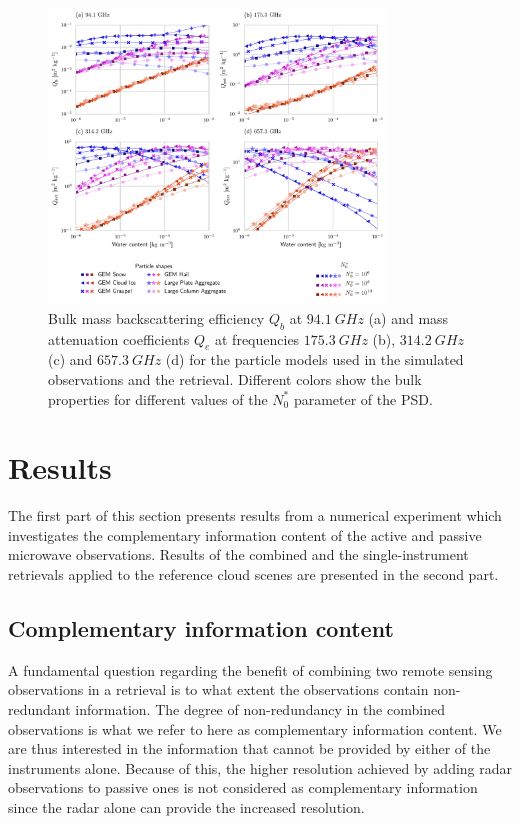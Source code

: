 \documentclass[journal abbreviation, manuscript]{copernicus}
\begin{document}
\begin{figure}
  \centering
  \includegraphics[width=0.8\textwidth]{../plots/particle_properties_d14}
  \caption{Bulk mass backscattering efficiency $Q_b$ at $94.1\ \unit{GHz}$ (a)
    and mass attenuation coefficients $Q_{e}$ at frequencies $175.3\ \unit{GHz}$
    (b), $314.2\ \unit{GHz}$ (c) and $657.3\ \unit{GHz}$ (d) for the particle
    models used in the simulated observations and the retrieval. Different
    colors show the bulk properties for different values of the $N_0^*$
    parameter of the PSD.}
  \label{fig:particle_properties}
\end{figure}

\section{Results}
\label{sec:results}

The first part of this section presents results from a numerical experiment which
investigates the complementary information content of the active and passive
microwave observations. Results of the combined and the single-instrument
retrievals applied to the reference cloud scenes are presented in the second
part.

\subsection{Complementary information content}
\label{sec:simple_cloud}

A fundamental question regarding the benefit of combining two remote sensing
observations in a retrieval is to what extent the observations contain
non-redundant information. The degree of non-redundancy in the combined
observations is what we refer to here as complementary information content. We
are thus interested in the information that cannot be provided by either of the
instruments alone. Because of this, the higher resolution achieved by adding
radar observations to passive ones is not considered as complementary
information since the radar alone can provide the increased resolution.
\end{document}
